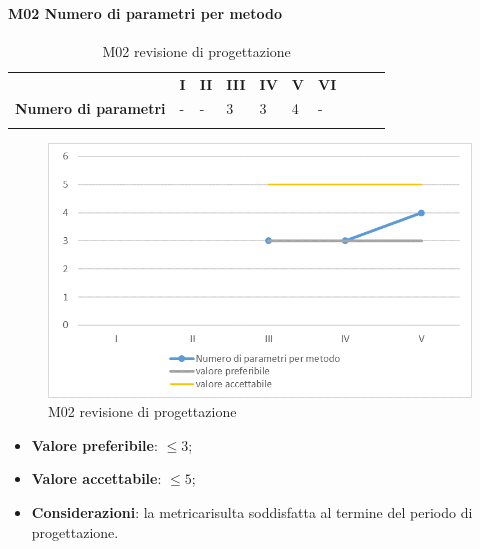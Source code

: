 \paragraph{M02 Numero di parametri per metodo} \mbox{}
\begin{longtable}[H!] {						
		>{}p{50mm}  		
		>{}p{8mm}
		>{}p{8mm}		
		>{}p{8mm}		
		>{}p{8mm}		
		>{}p{8mm}		
		>{}p{8mm}
		>{}p{8mm}
		>{}p{8mm}
		>{}p{8mm}
	}
	\rowcolor{gray!50}
	\textbf{} & \textbf{I} & \textbf{II} & \textbf{III} & \textbf{IV} & \textbf{V} & \textbf{VI} \TBstrut \\ [2mm]
	\textbf{Numero di parametri} & - & - & 3 & 3 & 4 & - \TBstrut \\ [2mm]
	\rowcolor{white}
	\caption{M02 revisione di progettazione\glo}
\end{longtable}
\begin{figure}[H] 	
\includegraphics[width=\linewidth]{./img/grafici/RP2.png}	
\caption{M02 revisione di progettazione\glo}	
\end{figure}
\begin{itemize}
	\item \textbf{Valore preferibile}: $\le3$;
	\item \textbf{Valore accettabile}: $\le5$;
	\item \textbf{Considerazioni}: la metrica\glosp risulta soddisfatta al termine del periodo di progettazione\glo.
\end{itemize}
\pagebreak
